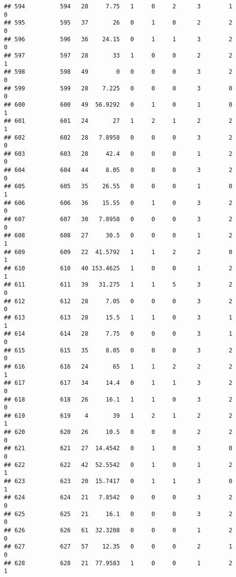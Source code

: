 \documentclass[
]{article}
\begin{document}
\begin{verbatim}
## 594          594   28     7.75   1     0     2      3        1         0
## 595          595   37       26   0     1     0      2        2         0
## 596          596   36    24.15   0     1     1      3        2         0
## 597          597   28       33   1     0     0      2        2         1
## 598          598   49        0   0     0     0      3        2         0
## 599          599   28    7.225   0     0     0      3        0         0
## 600          600   49  56.9292   0     1     0      1        0         1
## 601          601   24       27   1     2     1      2        2         1
## 602          602   28   7.8958   0     0     0      3        2         0
## 603          603   28     42.4   0     0     0      1        2         0
## 604          604   44     8.05   0     0     0      3        2         0
## 605          605   35    26.55   0     0     0      1        0         1
## 606          606   36    15.55   0     1     0      3        2         0
## 607          607   30   7.8958   0     0     0      3        2         0
## 608          608   27     30.5   0     0     0      1        2         1
## 609          609   22  41.5792   1     1     2      2        0         1
## 610          610   40 153.4625   1     0     0      1        2         1
## 611          611   39   31.275   1     1     5      3        2         0
## 612          612   28     7.05   0     0     0      3        2         0
## 613          613   28     15.5   1     1     0      3        1         1
## 614          614   28     7.75   0     0     0      3        1         0
## 615          615   35     8.05   0     0     0      3        2         0
## 616          616   24       65   1     1     2      2        2         1
## 617          617   34     14.4   0     1     1      3        2         0
## 618          618   26     16.1   1     1     0      3        2         0
## 619          619    4       39   1     2     1      2        2         1
## 620          620   26     10.5   0     0     0      2        2         0
## 621          621   27  14.4542   0     1     0      3        0         0
## 622          622   42  52.5542   0     1     0      1        2         1
## 623          623   20  15.7417   0     1     1      3        0         1
## 624          624   21   7.8542   0     0     0      3        2         0
## 625          625   21     16.1   0     0     0      3        2         0
## 626          626   61  32.3208   0     0     0      1        2         0
## 627          627   57    12.35   0     0     0      2        1         0
## 628          628   21  77.9583   1     0     0      1        2         1

\end{verbatim}
\end{document}
